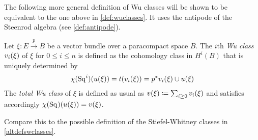 The following more general definition of Wu classes
will be shown to be equivalent to the one above in
\ref{def:wuclasses}.
It uses the antipode of the Steenrod algebra (see \autoref{def:antipode}). 
\begin{Def}
  Let $\xi\colon E\xrightarrow{p} B$ be a vector bundle over a
  paracompact space $B$.
  The $i$th \emph{Wu class} $v_i(\xi)$ of $\xi$ for $0\leq i\leq n$
  is defined as the cohomology class in $H^i(B)$ that is uniquely
  determined by
  \begin{gather*}
    \chi(\mathrm{Sq}^{i})(u(\xi)) = t(v_i(\xi)) = {p}^* v_i(\xi) \cup u(\xi)
  \end{gather*}
  The \emph{total Wu class} of $\xi$ is defined as usual as
  $v(\xi)\coloneqq\sum_{i\geq0}v_i(\xi)$ and satisfies accordingly 
  $\chi(\mathrm{Sq}^{})(u(\xi))=v(\xi)$.
\end{Def}
\begin{Rem}
  Compare this to the possible definition of the Stiefel-Whitney
  classes in \autoref{altdefswclasses}.
\end{Rem}

